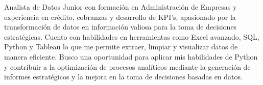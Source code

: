 

Analista de Datos Junior con formación en Administración de Empresas y experiencia en crédito, cobranzas y desarrollo de KPI's, apasionado por la transformación de datos en información valiosa para la toma de decisiones estratégicas. Cuento con habilidades en herramientas como Excel avanzado, SQL, Python  y Tableau lo que me permite extraer, limpiar y visualizar datos de manera eficiente. Busco una oportunidad para aplicar mis habilidades de Python y contribuir a la optimización de procesos analíticos mediante la generación de informes estratégicos y la mejora en la toma de decisiones basadas en datos. 
